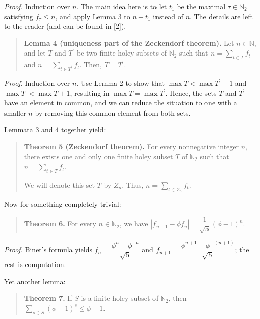 \documentclass[12pt,final,notitlepage,onecolumn]{article}%
\begin{document}
\textit{Proof.} Induction over $n$. The main idea here is to let $t_{1}$ be
the maximal $\tau\in\mathbb{N}_{2}$ satisfying $f_{\tau}\leq n$, and apply
Lemma 3 to $n-t_{1}$ instead of $n$. The details are left to the reader (and
can be found in [2]).

\begin{quote}
\textbf{Lemma 4 (uniqueness part of the Zeckendorf theorem).} Let
$n\in\mathbb{N}$, and let $T$ and $T^{\prime}$ be two finite holey subsets of
$\mathbb{N}_{2}$ such that $n=\sum\limits_{t\in T}f_{t}$ and $n=\sum
\limits_{t\in T^{\prime}}f_{t}$. Then, $T=T^{\prime}$.
\end{quote}

\textit{Proof.} Induction over $n$. Use Lemma 2 to show that $\max T<\max
T^{\prime}+1$ and $\max T^{\prime}<\max T+1$, resulting in $\max T=\max
T^{\prime}$. Hence, the sets $T$ and $T^{\prime}$ have an element in common,
and we can reduce the situation to one with a smaller $n$ by removing this
common element from both sets.

Lemmata 3 and 4 together yield:

\begin{quote}
\textbf{Theorem 5 (Zeckendorf theorem).} For every nonnegative integer $n$,
there exists one and only one finite holey subset $T$ of $\mathbb{N}_{2}$ such
that $n=\sum\limits_{t\in T}f_{t}$.

We will denote this set $T$ by $Z_{n}$. Thus, $n=\sum\limits_{t\in Z_{n}}%
f_{t}$.
\end{quote}

Now for something completely trivial:

\begin{quote}
\textbf{Theorem 6.} For every $n\in\mathbb{N}_{2}$, we have $\left\vert
f_{n+1}-\phi f_{n}\right\vert =\dfrac{1}{\sqrt{5}}\left(  \phi-1\right)  ^{n}$.
\end{quote}

\textit{Proof.} Binet's formula yields $f_{n}=\dfrac{\phi^{n}-\phi^{-n}}%
{\sqrt{5}}$ and $f_{n+1}=\dfrac{\phi^{n+1}-\phi^{-\left(  n+1\right)  }}%
{\sqrt{5}}$; the rest is computation.

Yet another lemma:

\begin{quote}
\textbf{Theorem 7.} If $S$ is a finite holey subset of $\mathbb{N}_{2}$, then
$\sum\limits_{s\in S}\left(  \phi-1\right)  ^{s}\leq\phi-1$.
\end{quote}
\end{document}
